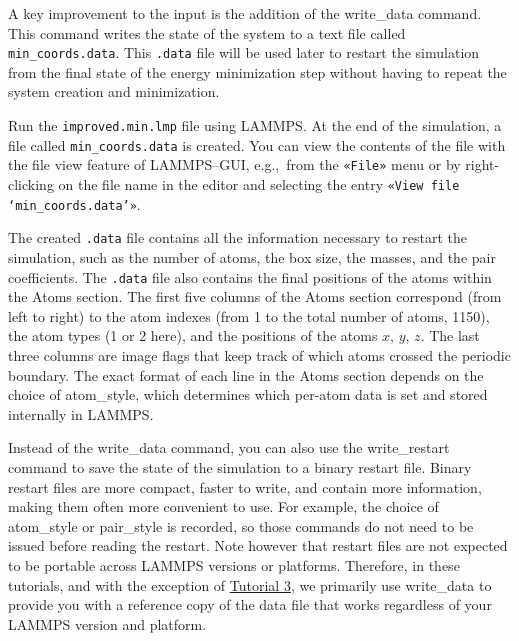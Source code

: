 \documentclass[9pt,tutorial]{livecoms}
\newcommand{\lmpcmd}[1]{\hspace{0pt}\colorbox{listing}{\textcolor{command}{\small{#1}}}\hspace{0pt}} %
\newcommand{\lmpcmdnote}[1]{\hspace{0pt}\colorbox{note_listing}{\textcolor{command}{\small{#1}}}\hspace{0pt}} %
\newcommand{\flecmd}[1]{\textcolor{command}{\texttt{#1}}} %
\newcommand{\guicmd}[1]{\textcolor{command}{\texttt{«#1»}}} %
\begin{document}
A key improvement to the input is the addition of the
\lmpcmd{write\_data} command.  This command writes the state
of the system to a text file called \flecmd{min\_coords.data}.
This \flecmd{.data} file will be used later
to restart the simulation from the final state of the energy
minimization step without having to repeat the system creation and
minimization.

Run the \flecmd{improved.min.lmp} file using LAMMPS.  At the end of the simulation, a file
called \flecmd{min\_coords.data} is created.  You can view the contents
of the file with the file view feature of LAMMPS--GUI, e.g.,~from the
\guicmd{File} menu or by right-clicking on the file name in the editor
and selecting the entry \guicmd{View file `min\_coords.data'}.

The created \flecmd{.data} file contains all the information necessary to
restart the simulation, such as the number of atoms, the box size, the
masses, and the pair coefficients.  The
\flecmd{.data} file also contains the final
positions of the atoms within the \lmpcmd{Atoms} section.  The first five
columns of the \lmpcmd{Atoms} section correspond (from left to right) to
the atom indexes (from 1 to the total number of atoms, 1150), the atom
types (1 or 2 here), and the positions of the atoms $x$, $y$, $z$.  The
last three columns are image flags that keep track of which atoms
crossed the periodic boundary.  The exact format of each line in the
\lmpcmd{Atoms} section depends on the choice of \lmpcmd{atom\_style}, which
determines which per-atom data is set and stored internally in LAMMPS.

\begin{note}
Instead of the \lmpcmdnote{write\_data} command, you can also use the
\lmpcmdnote{write\_restart} command to save the state
of the simulation to a binary restart file.  Binary restart files are
more compact, faster to write, and contain more information, making them often
more convenient to use.  For example, the choice of \lmpcmdnote{atom\_style}
or \lmpcmdnote{pair\_style} is recorded, so those commands do not need to be issued
before reading the restart.  Note however that restart files are not expected to be
portable across LAMMPS versions or platforms.  Therefore, in these tutorials,
and with the exception of \hyperref[all-atom-label]{Tutorial 3}, we primarily use \lmpcmdnote{write\_data} to provide you with a reference
copy of the data file that works regardless of your LAMMPS version and platform.
\end{note}
\end{document}

